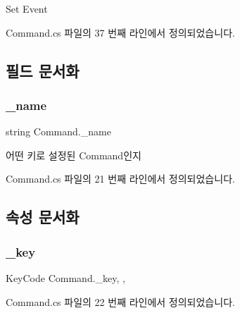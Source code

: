 Set Event 



Command.\+cs 파일의 37 번째 라인에서 정의되었습니다.


\begin{DoxyCode}{0}

\end{DoxyCode}


\subsection{필드 문서화}
\mbox{\label{class_command_a18a8a95d7f2c65bfa786fb525c42d0c4}} 
\subsubsection{\texorpdfstring{\_name}{\_name}}
{\footnotesize\ttfamily string Command.\+\_\+name}



어떤 키로 설정된 Command인지 



Command.\+cs 파일의 21 번째 라인에서 정의되었습니다.



\subsection{속성 문서화}
\mbox{\label{class_command_a85e9adc5f9994f8da6b21bbad6dfb13d}} 
\subsubsection{\texorpdfstring{\_key}{\_key}}
{\footnotesize\ttfamily Key\+Code Command.\+\_\+key\hspace{0.3cm}{\ttfamily [get]}, {\ttfamily [set]}, {\ttfamily [private]}}



Command.\+cs 파일의 22 번째 라인에서 정의되었습니다.


\begin{DoxyCode}{0}

\end{DoxyCode}


